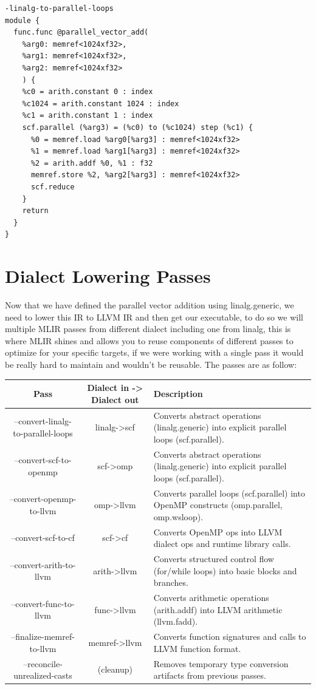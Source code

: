 \begin{verbatim}
-linalg-to-parallel-loops
module {
  func.func @parallel_vector_add(
    %arg0: memref<1024xf32>, 
    %arg1: memref<1024xf32>, 
    %arg2: memref<1024xf32>
    ) {
    %c0 = arith.constant 0 : index
    %c1024 = arith.constant 1024 : index
    %c1 = arith.constant 1 : index
    scf.parallel (%arg3) = (%c0) to (%c1024) step (%c1) {
      %0 = memref.load %arg0[%arg3] : memref<1024xf32>
      %1 = memref.load %arg1[%arg3] : memref<1024xf32>
      %2 = arith.addf %0, %1 : f32
      memref.store %2, %arg2[%arg3] : memref<1024xf32>
      scf.reduce 
    }
    return
  }
}
\end{verbatim}


\section*{Dialect Lowering Passes}
Now that we have defined the parallel vector addition using linalg.generic, we need to lower this IR to LLVM IR and then get our executable, to do so we will multiple MLIR passes from different dialect including one from linalg, this is where MLIR shines and allows you to reuse components of different passes to optimize for your specific targets, if we were working with a single pass it would be really hard to maintain and wouldn't be reusable. The passes are as follow:

\begin{center}
\begin{tabular}{||c c p{7cm}||} 
 \hline
 Pass & Dialect in -> Dialect out & Description \\ [0.5ex] 
 \hline\hline
 --convert-linalg-to-parallel-loops & linalg->scf & Converts abstract operations (linalg.generic) into explicit parallel loops (scf.parallel). \\ 
 \hline
 --convert-scf-to-openmp & scf->omp & Converts abstract operations (linalg.generic) into explicit parallel loops (scf.parallel). \\
 \hline
 --convert-openmp-to-llvm & omp->llvm & Converts parallel loops (scf.parallel) into OpenMP constructs (omp.parallel, omp.wsloop). \\
 \hline
 --convert-scf-to-cf & scf->cf & Converts OpenMP ops into LLVM dialect ops and runtime library calls. \\
 \hline
 --convert-arith-to-llvm & arith->llvm & Converts structured control flow (for/while loops) into basic blocks and branches. \\ 
 \hline
 --convert-func-to-llvm & func->llvm & Converts arithmetic operations (arith.addf) into LLVM arithmetic (llvm.fadd). \\ 
 \hline
 --finalize-memref-to-llvm & memref->llvm & Converts function signatures and calls to LLVM function format. \\ 
 \hline
 --reconcile-unrealized-casts & (cleanup) & Removes temporary type conversion artifacts from previous passes. \\ 
 \hline
\end{tabular}
\end{center}

